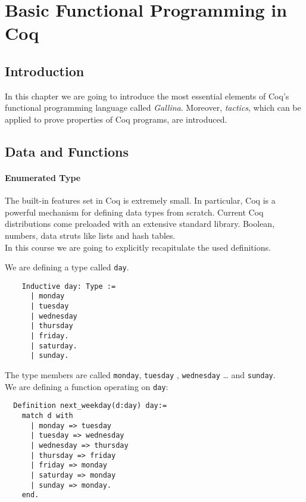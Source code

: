 \section{Basic Functional Programming in Coq}



\subsection{Introduction}

In this chapter we are going to introduce the most essential elements of Coq's functional programming language called {\itshape  Gallina}. 
Moreover, {\itshape tactics}, which can be applied to prove properties of Coq programs, are introduced.


\subsection{Data and Functions}

 \paragraph{Enumerated Type}
 
  The built-in features set in Coq is extremely small. In particular, Coq is a powerful mechanism for defining data types from scratch.
  Current Coq distributions come preloaded with an extensive standard library.
  Boolean, numbers, data struts like lists and hash tables.\\
  In this course we are going to explicitly recapitulate the used definitions.
   
  
  \begin{example}
  We are defining a type called \lstinline!day!.
  \begin{lstlisting}
    Inductive day: Type :=
	  | monday
	  | tuesday
	  | wednesday
	  | thursday
	  | friday.
	  | saturday.
	  | sunday.
	  \end{lstlisting} 
  
  The type members are called \lstinline!monday!, \lstinline!tuesday! , \lstinline!wednesday! \ldots{} and \lstinline!sunday!.\\
  
  We are defining a function operating on \lstinline!day!: 
  \begin{lstlisting}
  Definition next_weekday(d:day) day:=
    match d with 
	  | monday => tuesday
	  | tuesday => wednesday
	  | wednesday => thursday
	  | thursday => friday
	  | friday => monday
	  | saturday => monday
	  | sunday => monday.
    end.  
  \end{lstlisting}
  \end{example}

